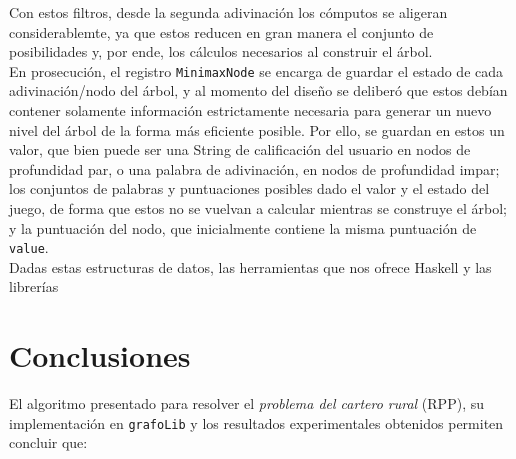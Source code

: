 \documentclass[11pt]{article}
\begin{document}
Con estos filtros, desde la segunda adivinación los cómputos se aligeran
considerablemte, ya que estos reducen en gran manera el conjunto de posibilidades
y, por ende, los cálculos necesarios al construir el árbol. \\

En prosecución, el registro \texttt{MinimaxNode} se encarga de guardar el estado de
cada adivinación/nodo del árbol, y al momento del diseño se deliberó que estos
debían contener solamente información estrictamente necesaria para generar
un nuevo nivel del árbol de la forma más eficiente posible. Por ello, se guardan
en estos un valor, que bien puede ser una String de calificación del usuario en
nodos de profundidad par, o una palabra de adivinación, en nodos de profundidad
impar; los conjuntos de palabras y puntuaciones posibles dado el valor y el estado
del juego, de forma que estos no se vuelvan a calcular mientras se construye el
árbol; y la puntuación del nodo, que inicialmente contiene la misma puntuación de
\texttt{value}. \\

Dadas estas estructuras de datos, las herramientas que nos ofrece Haskell y las
librerías

\section{Conclusiones}

El algoritmo presentado para resolver el \emph{problema del cartero rural} (RPP),
su implementación en \texttt{grafoLib} y los resultados 
experimentales obtenidos permiten concluir que:
\end{document}
